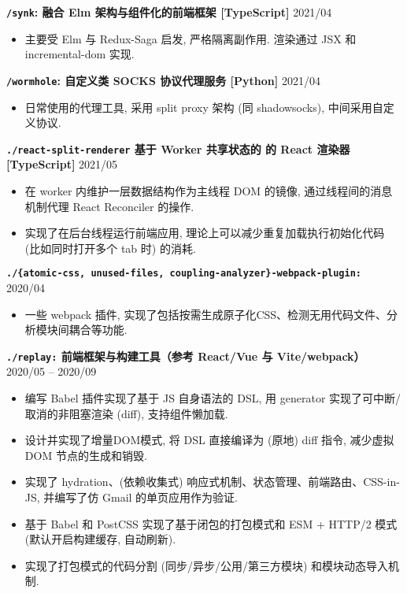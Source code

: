 \documentclass[10 pt]{article}
\begin{document}
\textbf{\texttt{/synk}:  融合 Elm 架构与组件化的前端框架  [TypeScript]} \hfill 2021/04
\begin{itemize} 
\item 主要受 Elm 与 Redux-Saga 启发, 严格隔离副作用. 渲染通过 JSX 和 incremental-dom 实现. 
\end{itemize}

\textbf{\texttt{/wormhole}:  自定义类 SOCKS 协议代理服务 [Python]} \hfill 2021/04
\begin{itemize}
\item 日常使用的代理工具, 采用 split proxy 架构 (同 shadowsocks), 中间采用自定义协议.
\end{itemize}


\textbf{\texttt{./react-split-renderer}  基于 Worker 共享状态的 的 React 渲染器 [TypeScript]} \hfill 2021/05 
\begin{itemize}
\item  在 worker 内维护一层数据结构作为主线程 DOM 的镜像, 通过线程间的消息机制代理 React Reconciler 的操作.
\item 实现了在后台线程运行前端应用, 理论上可以减少重复加载执行初始化代码 (比如同时打开多个 tab 时) 的消耗.
\end{itemize}

\textbf{\texttt{./\{atomic-css, unused-files, coupling-analyzer\}-webpack-plugin:} } \hfill 2020/04
\begin{itemize}
\item 一些 webpack 插件, 实现了包括按需生成原子化CSS、检测无用代码文件、分析模块间耦合等功能.
\end{itemize}

\textbf{\texttt{./replay:} 前端框架与构建工具（参考 React/Vue 与 Vite/webpack）} \hfill 2020/05 -- 2020/09
\begin{itemize}
\item 编写 Babel 插件实现了基于 JS 自身语法的 DSL, 用 generator 实现了可中断/取消的非阻塞渲染 (diff), 支持组件懒加载.
\item 设计并实现了增量DOM模式, 将 DSL 直接编译为 (原地) diff 指令, 减少虚拟 DOM 节点的生成和销毁.
\item 实现了 hydration、(依赖收集式) 响应式机制、状态管理、前端路由、CSS-in-JS, 并编写了仿 Gmail 的单页应用作为验证.
\item 基于 Babel 和 PostCSS 实现了基于闭包的打包模式和 ESM + HTTP/2 模式 (默认开启构建缓存, 自动刷新).
\item 实现了打包模式的代码分割 (同步/异步/公用/第三方模块) 和模块动态导入机制.
\end{itemize}
\end{document}
